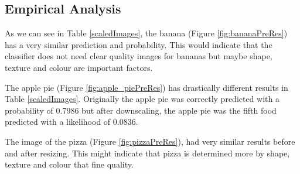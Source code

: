 \subsection*{Empirical Analysis}
As we can see in Table \ref{scaledImages}, the banana (Figure \ref{fig:bananaPreRes}) has a very similar prediction and probability.
This would indicate that the classifier does not need clear quality images for bananas but maybe shape, texture and colour are important factors.

The apple pie (Figure \ref{fig:apple_piePreRes}) has drastically different results in Table \ref{scaledImages}.
Originally the apple pie was correctly predicted with a probability of 0.7986 but after downscaling, the apple pie was the fifth food predicted with a likelihood of 0.0836.

The image of the pizza (Figure \ref{fig:pizzaPreRes}), had very similar results before and after resizing.
This might indicate that pizza is determined more by shape, texture and colour that fine quality.


